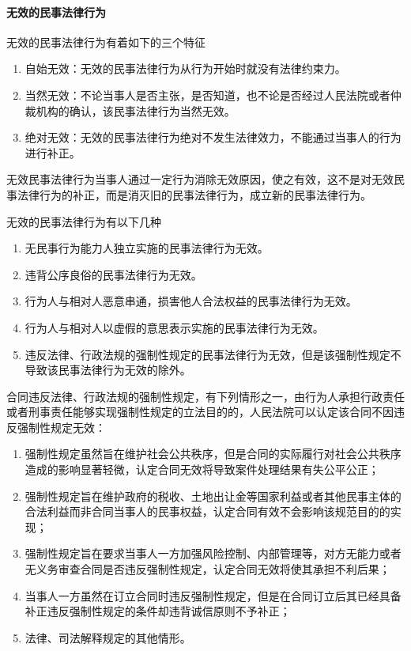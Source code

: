 \documentclass[UTF8,12pt]{ctexart}
\numberwithin{equation}{section} %
\numberwithin{figure}{section}
\numberwithin{table}{section}
\begin{document}
	\paragraph{无效的民事法律行为}
	无效的民事法律行为有着如下的三个特征
	\begin{enumerate}
		\item 自始无效：无效的民事法律行为从行为开始时就没有法律约束力。
		
		\item 当然无效：不论当事人是否主张，是否知道，也不论是否经过人民法院或者仲裁机构的确认，该民事法律行为当然无效。
		
		\item 绝对无效：无效的民事法律行为绝对不发生法律效力，不能通过当事人的行为进行补正。
	\end{enumerate}
	
	无效民事法律行为当事人通过一定行为消除无效原因，使之有效，这不是对无效民事法律行为的补正，而是消灭旧的民事法律行为，成立新的民事法律行为。
	
	无效的民事法律行为有以下几种
	\begin{enumerate}
		\item 无民事行为能力人独立实施的民事法律行为无效。
		
		\item 违背公序良俗的民事法律行为无效。
		
		\item 行为人与相对人恶意串通，损害他人合法权益的民事法律行为无效。
		
		\item 行为人与相对人以虚假的意思表示实施的民事法律行为无效。
		
		\item 违反法律、行政法规的强制性规定的民事法律行为无效，但是该强制性规定不导致该民事法律行为无效的除外。
	\end{enumerate}
	
	合同违反法律、行政法规的强制性规定，有下列情形之一，由行为人承担行政责任或者刑事责任能够实现强制性规定的立法目的的，人民法院可以认定该合同不因违反强制性规定无效：
	\begin{enumerate}
		\item 强制性规定虽然旨在维护社会公共秩序，但是合同的实际履行对社会公共秩序造成的影响显著轻微，认定合同无效将导致案件处理结果有失公平公正；
		
		\item 强制性规定旨在维护政府的税收、土地出让金等国家利益或者其他民事主体的合法利益而非合同当事人的民事权益，认定合同有效不会影响该规范目的的实现；
		
		\item 强制性规定旨在要求当事人一方加强风险控制、内部管理等，对方无能力或者无义务审查合同是否违反强制性规定，认定合同无效将使其承担不利后果；
		
		\item 当事人一方虽然在订立合同时违反强制性规定，但是在合同订立后其已经具备补正违反强制性规定的条件却违背诚信原则不予补正；
		
		\item 法律、司法解释规定的其他情形。
	\end{enumerate}
	
\end{document}
